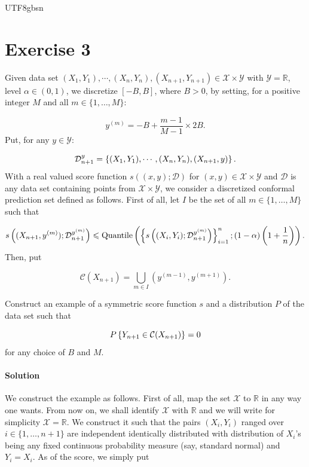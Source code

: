 \documentclass[../../main.tex]{subfiles}
\begin{document}
\begin{CJK*}{UTF8}{gbsn}

\section*{Exercise 3}

Given data set $(X_1, Y_1), \cdots, (X_{n}, Y_{n}), (X_{n+1}, Y_{n+1})
\in \mathcal{X} \times \mathcal{Y}$ with $\mathcal{Y} = \mathbb{R}$,
level $\alpha \in (0,1)$, we discretize $[-B,B]$, where $B > 0$,
by setting, for a positive integer $M$ and all $m \in \{1, \ldots, M\}$:

\begin{equation*}
    y^{(m)} = - B + \frac{m-1}{M-1} \times 2B.
\end{equation*}
Put, for any $y \in \mathcal{Y}$:

\begin{equation*}
    \mathcal{D}_{n+1}^y = \left \{ (X_1, Y_1), \cdots, (X_{n}, Y_{n}), (X_{n+1}, y) \right \}.
\end{equation*}
With a real valued score function $s((x,y); \mathcal{D})$
for $(x,y) \in \mathcal{X} \times \mathcal{Y}$
and $\mathcal{D}$ is any data set containing points from $\mathcal{X} \times \mathcal{Y}$,
we consider a discretized conformal prediction set defined as follows.
First of all, let $I$ be the set of all $m \in \{1, \ldots, M\}$
such that 

\begin{equation*}
    s \left ( (X_{n+1}, y^{(m)}); \mathcal{D}_{n+1}^{y^{(m)}} \right ) 
    \leqslant
    \text{Quantile} \left ( \left \{ s \left ( (X_{i}, Y_i); \mathcal{D}_{n+1}^{y^{(m)}} \right ) \right \}_{i=1}^n; 
    (1- \alpha) \left ( 1 + \frac{1}{n} \right ) \right ).
\end{equation*}
Then, put 

\begin{equation*}
    \mathcal{C}(X_{n+1}) = \bigcup_{m \in I} (y^{(m-1)}, y^{(m+1)}).
\end{equation*}

Construct an example of a symmetric score function $s$ and 
a distribution $P$ of the data set 
such that 

\begin{equation*}
    P \left \{ Y_{n+1} \in \mathcal{C}(X_{n+1}) \right \} = 0
\end{equation*}
for any choice of $B$ and $M$.

\paragraph{Solution}
We construct the example as follows.
First of all, map the set $\mathcal{X}$ to $\mathbb{R}$ in any way one wants.
From now on, we shall identify $\mathcal{X}$ with $\mathbb{R}$
and we will write for simplicity $\mathcal{X} = \mathbb{R}$.
We construct it such that the pairs $(X_i,Y_i)$ ranged over $i \in \{1, \ldots, n+1\}$
are independent identically distributed with distribution of $X_i$'s being 
any fixed continuous probability measure (say, standard normal) and $Y_i = X_i$.
As of the score, we simply put


\end{CJK*}
\end{document}
